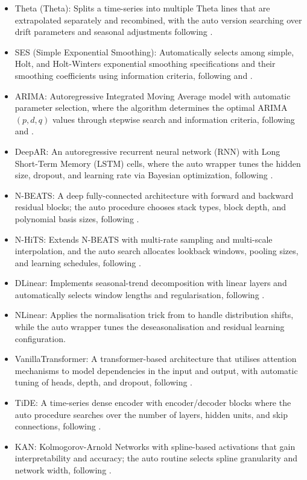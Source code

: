 \documentclass{article}
\begin{document}
\begin{itemize}
    \item Theta (Theta): Splits a time-series into multiple Theta lines that are extrapolated separately and recombined, with the auto version searching over drift parameters and seasonal adjustments following \cite{Assimakopoulos2000}.
    \item SES (Simple Exponential Smoothing): Automatically selects among simple, Holt, and Holt-Winters exponential smoothing specifications and their smoothing coefficients using information criteria, following \cite{Brown2004} and \cite{Winters1960}.
    \item ARIMA: Autoregressive Integrated Moving Average model with automatic parameter selection, where the algorithm determines the optimal ARIMA$(p,d,q)$ values through stepwise search and information criteria, following \cite{Box2013} and \cite{Hyndman2008}.
    \item DeepAR: An autoregressive recurrent neural network (RNN) with Long Short-Term Memory (LSTM) cells, where the auto wrapper tunes the hidden size, dropout, and learning rate via Bayesian optimization, following \cite{Salinas2020}.
    \item N-BEATS: A deep fully-connected architecture with forward and backward residual blocks; the auto procedure chooses stack types, block depth, and polynomial basis sizes, following \cite{Oreshkin2020}.
    \item N-HiTS: Extends N-BEATS with multi-rate sampling and multi-scale interpolation, and the auto search allocates lookback windows, pooling sizes, and learning schedules, following \cite{Challu2022}.
    \item DLinear: Implements seasonal-trend decomposition with linear layers and automatically selects window lengths and regularisation, following \cite{Zeng2022}.
    \item NLinear: Applies the normalisation trick from \cite{Zeng2022} to handle distribution shifts, while the auto wrapper tunes the deseasonalisation and residual learning configuration.
    \item VanillaTransformer: A transformer-based architecture that utilises attention mechanisms to model dependencies in the input and output, with automatic tuning of heads, depth, and dropout, following \cite{Vaswani2017}.
    \item TiDE: A time-series dense encoder with encoder/decoder blocks where the auto procedure searches over the number of layers, hidden units, and skip connections, following \cite{Das2023a}.
    \item KAN: Kolmogorov-Arnold Networks with spline-based activations that gain interpretability and accuracy; the auto routine selects spline granularity and network width, following \cite{Liu2025}.
\end{itemize}
\end{document}
